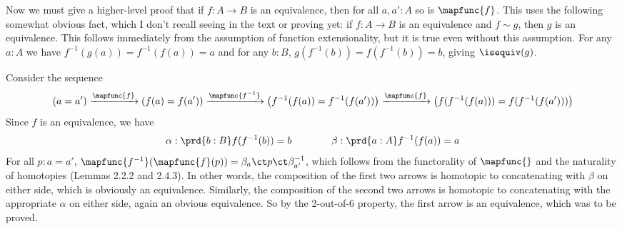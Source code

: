Now we must give a higher-level proof that if $f : A \to B$ is an equivalence,
then for all $a, a' : A$ so is $\mapfunc{f}$.  This uses the following
somewhat obvious fact, which I don't recall seeing in the text or proving yet:
if $f : A \to B$ is an equivalence and $f \sim g$, then $g$ is an equivalence.
This follows immediately from the assumption of function extensionality, but it
is true even without this assumption.
For any $a : A$ we have $f^{-1}(g(a)) = f^{-1}(f(a)) = a$
and for any $b : B$, $g(f^{-1}(b)) = f(f^{-1}(b)) = b$, giving $\isequiv(g)$.


Consider the sequence
\[
   \left(a = a'\right) \xrightarrow{\mapfunc{f}} 
   \left(f(a) = f(a')\right) \xrightarrow{\mapfunc{f^{-1}}} 
   \left(f^{-1}(f(a)) = f^{-1}(f(a'))\right) \xrightarrow{\mapfunc{f}} 
   \left(f(f^{-1}(f(a))) = f(f^{-1}(f(a')))\right)
\]
Since $f$ is an equivalence, we have
\[
  \alpha : \prd{b:B} f(f^{-1}(b)) = b
  \qquad\qquad
  \beta : \prd{a:A} f^{-1}(f(a)) = a
\]
For all $p : a = a'$, 
$\mapfunc{f^{-1}}(\mapfunc{f}(p)) = \beta_{a} \ct p \ct \beta_{a'}^{-1}$, 
which follows from the functorality of $\mapfunc{}$ and the naturality of
homotopies (Lemmas 2.2.2 and 2.4.3).  In other words, the composition of the
first two arrows is homotopic to concatenating with $\beta$ on either side,
which is obviously an equivalence.  Similarly, the composition of the second
two arrows is homotopic to concatenating with the appropriate $\alpha$ on
either side, again an obvious equivalence.  So by the 2-out-of-6 property, the
first arrow is an equivalence, which was to be proved.
